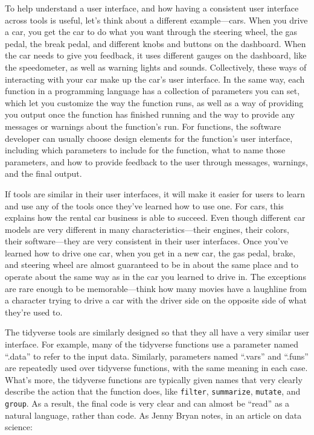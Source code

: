 \documentclass[]{tufte-book}
\begin{document}
To help understand a user interface, and how having a consistent user interface
across tools is useful, let's think about a different example---cars. When you
drive a car, you get the car to do what you want through the steering wheel, the
gas pedal, the break pedal, and different knobs and buttons on the dashboard.
When the car needs to give you feedback, it uses different gauges on the
dashboard, like the speedometer, as well as warning lights and sounds.
Collectively, these ways of interacting with your car make up the car's user
interface. In the same way, each function in a programming language has a
collection of parameters you can set, which let you customize the way the
function runs, as well as a way of providing you output once the function has
finished running and the way to provide any messages or warnings about the
function's run. For functions, the software developer can usually choose design
elements for the function's user interface, including which parameters to
include for the function, what to name those parameters, and how to provide
feedback to the user through messages, warnings, and the final output.

If tools are similar in their user interfaces, it will make it
easier for users to learn and use any of the tools once
they've learned how to use one. For cars, this explains how the rental car
business is able to succeed. Even though different car models are very different
in many characteristics---their engines, their colors, their software---they are
very consistent in their user interfaces. Once you've learned how to drive one
car, when you get in a new car, the gas pedal, brake, and steering wheel are
almost guaranteed to be in about the same place and to operate about the same
way as in the car you learned to drive in. The exceptions are rare enough to be
memorable---think how many movies have a laughline from a character trying to
drive a car with the driver side on the opposite side of what they're used to.

The tidyverse tools are similarly designed so that they all have a very similar
user interface. For example, many of the tidyverse functions use a parameter
named ``.data'' to refer to the input data. Similarly, parameters
named ``.vars'' and ``.funs'' are repeatedly used over tidyverse functions, with the
same meaning in each case. What's more, the tidyverse functions are typically given names
that very clearly describe the action that the function does, like \texttt{filter},
\texttt{summarize}, \texttt{mutate}, and \texttt{group}. As a result, the final code is very clear
and can almost be ``read'' as a natural language, rather than code. As Jenny
Bryan notes, in an article on data science:
\end{document}
